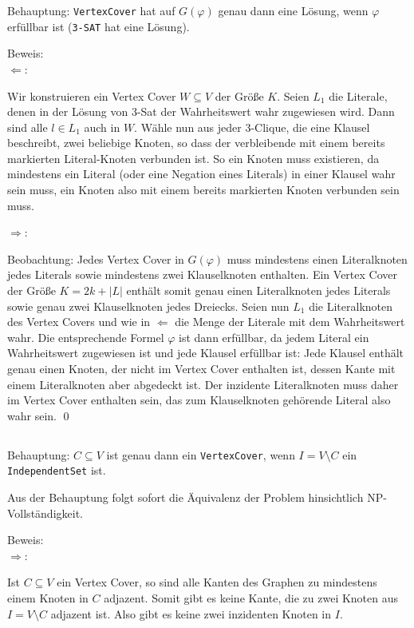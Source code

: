\documentclass[a4paper]{article}
\begin{document}
Behauptung: \texttt{VertexCover} hat auf $G(\varphi)$ genau dann eine Lösung, wenn $\varphi$ erfüllbar ist (\texttt{3-SAT} hat eine Lösung).

Beweis: \\
$\Leftarrow$:

Wir konstruieren ein Vertex Cover $W \subseteq V$ der Größe $K$.
Seien $L_1$ die Literale, denen in der Lösung von 3-Sat der Wahrheitswert wahr zugewiesen wird.
Dann sind alle $l \in L_1$ auch in $W$.
Wähle nun aus jeder 3-Clique, die eine Klausel beschreibt, zwei beliebige Knoten, so dass der verbleibende mit einem bereits markierten Literal-Knoten verbunden ist.
So ein Knoten muss existieren, da mindestens ein Literal (oder eine Negation eines Literals) in einer Klausel wahr sein muss, ein Knoten also mit einem bereits markierten Knoten verbunden sein muss.

$\Rightarrow$:

Beobachtung: Jedes Vertex Cover in $G(\varphi)$ muss mindestens einen Literalknoten jedes Literals sowie mindestens zwei Klauselknoten enthalten.
Ein Vertex Cover der Größe $K = 2k + |L|$ enthält somit genau einen Literalknoten jedes Literals sowie genau zwei Klauselknoten jedes Dreiecks.
Seien nun $L_1$ die Literalknoten des Vertex Covers und wie in $\Leftarrow$ die Menge der Literale mit dem Wahrheitswert wahr.
Die entsprechende Formel $\varphi$ ist dann erfüllbar, da jedem Literal ein Wahrheitswert zugewiesen ist und jede Klausel erfüllbar ist:
Jede Klausel enthält genau einen Knoten, der nicht im Vertex Cover enthalten ist, dessen Kante mit einem Literalknoten aber abgedeckt ist.
Der inzidente Literalknoten muss daher im Vertex Cover enthalten sein, das zum Klauselknoten gehörende Literal also wahr sein.
\hfill{} \qed{}

\subsection{}
Behauptung: $C \subseteq V$ ist genau dann ein \texttt{VertexCover}, wenn $I = V \setminus C$ ein \texttt{IndependentSet} ist.

Aus der Behauptung folgt sofort die Äquivalenz der Problem hinsichtlich NP-Vollständigkeit.

Beweis: \\
$\Rightarrow$:

Ist $C \subseteq V$ ein Vertex Cover, so sind alle Kanten des Graphen zu mindestens einem Knoten in $C$ adjazent.
Somit gibt es keine Kante, die zu zwei Knoten aus $I = V \setminus C$ adjazent ist.
Also gibt es keine zwei inzidenten Knoten in $I$.
\end{document}

